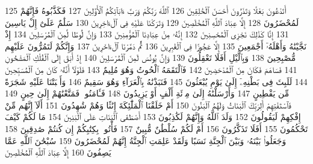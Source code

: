 {\tiny\colorbox{cl_aya}{125}} أَتَدْعُونَ بَعْلًا وَتَذَرُونَ أَحْسَنَ ٱلْخَٰلِقِينَ
{\tiny\colorbox{cl_aya}{126}} ٱللَّهَ رَبَّكُمْ وَرَبَّ ءَابَآئِكُمُ ٱلْأَوَّلِينَ
{\tiny\colorbox{cl_aya}{127}} فَكَذَّبُوهُ فَإِنَّهُمْ لَمُحْضَرُونَ
{\tiny\colorbox{cl_aya}{128}} إِلَّا عِبَادَ ٱللَّهِ ٱلْمُخْلَصِينَ
{\tiny\colorbox{cl_aya}{129}} وَتَرَكْنَا عَلَيْهِ فِى ٱلْءَاخِرِينَ
{\tiny\colorbox{cl_aya}{130}} سَلَٰمٌ عَلَىٰٓ إِلْ يَاسِينَ
{\tiny\colorbox{cl_aya}{131}} إِنَّا كَذَٰلِكَ نَجْزِى ٱلْمُحْسِنِينَ
{\tiny\colorbox{cl_aya}{132}} إِنَّهُۥ مِنْ عِبَادِنَا ٱلْمُؤْمِنِينَ
{\tiny\colorbox{cl_aya}{133}} وَإِنَّ لُوطًا لَّمِنَ ٱلْمُرْسَلِينَ
{\tiny\colorbox{cl_aya}{134}} إِذْ نَجَّيْنَٰهُ وَأَهْلَهُۥٓ أَجْمَعِينَ
{\tiny\colorbox{cl_aya}{135}} إِلَّا عَجُوزًا فِى ٱلْغَٰبِرِينَ
{\tiny\colorbox{cl_aya}{136}} ثُمَّ دَمَّرْنَا ٱلْءَاخَرِينَ
{\tiny\colorbox{cl_aya}{137}} وَإِنَّكُمْ لَتَمُرُّونَ عَلَيْهِم مُّصْبِحِينَ
{\tiny\colorbox{cl_aya}{138}} وَبِٱلَّيْلِ أَفَلَا تَعْقِلُونَ
{\tiny\colorbox{cl_aya}{139}} وَإِنَّ يُونُسَ لَمِنَ ٱلْمُرْسَلِينَ
{\tiny\colorbox{cl_aya}{140}} إِذْ أَبَقَ إِلَى ٱلْفُلْكِ ٱلْمَشْحُونِ
{\tiny\colorbox{cl_aya}{141}} فَسَاهَمَ فَكَانَ مِنَ ٱلْمُدْحَضِينَ
{\tiny\colorbox{cl_aya}{142}} فَٱلْتَقَمَهُ ٱلْحُوتُ وَهُوَ مُلِيمٌ
{\tiny\colorbox{cl_aya}{143}} فَلَوْلَآ أَنَّهُۥ كَانَ مِنَ ٱلْمُسَبِّحِينَ
{\tiny\colorbox{cl_aya}{144}} لَلَبِثَ فِى بَطْنِهِۦٓ إِلَىٰ يَوْمِ يُبْعَثُونَ
{\tiny\colorbox{cl_aya}{145}} فَنَبَذْنَٰهُ بِٱلْعَرَآءِ وَهُوَ سَقِيمٌ
{\tiny\colorbox{cl_aya}{146}} وَأَنۢبَتْنَا عَلَيْهِ شَجَرَةً مِّن يَقْطِينٍ
{\tiny\colorbox{cl_aya}{147}} وَأَرْسَلْنَٰهُ إِلَىٰ مِا۟ئَةِ أَلْفٍ أَوْ يَزِيدُونَ
{\tiny\colorbox{cl_aya}{148}} فَـَٔامَنُوا۟ فَمَتَّعْنَٰهُمْ إِلَىٰ حِينٍ
{\tiny\colorbox{cl_aya}{149}} فَٱسْتَفْتِهِمْ أَلِرَبِّكَ ٱلْبَنَاتُ وَلَهُمُ ٱلْبَنُونَ
{\tiny\colorbox{cl_aya}{150}} أَمْ خَلَقْنَا ٱلْمَلَٰٓئِكَةَ إِنَٰثًا وَهُمْ شَٰهِدُونَ
{\tiny\colorbox{cl_aya}{151}} أَلَآ إِنَّهُم مِّنْ إِفْكِهِمْ لَيَقُولُونَ
{\tiny\colorbox{cl_aya}{152}} وَلَدَ ٱللَّهُ وَإِنَّهُمْ لَكَٰذِبُونَ
{\tiny\colorbox{cl_aya}{153}} أَصْطَفَى ٱلْبَنَاتِ عَلَى ٱلْبَنِينَ
{\tiny\colorbox{cl_aya}{154}} مَا لَكُمْ كَيْفَ تَحْكُمُونَ
{\tiny\colorbox{cl_aya}{155}} أَفَلَا تَذَكَّرُونَ
{\tiny\colorbox{cl_aya}{156}} أَمْ لَكُمْ سُلْطَٰنٌ مُّبِينٌ
{\tiny\colorbox{cl_aya}{157}} فَأْتُوا۟ بِكِتَٰبِكُمْ إِن كُنتُمْ صَٰدِقِينَ
{\tiny\colorbox{cl_aya}{158}} وَجَعَلُوا۟ بَيْنَهُۥ وَبَيْنَ ٱلْجِنَّةِ نَسَبًا وَلَقَدْ عَلِمَتِ ٱلْجِنَّةُ إِنَّهُمْ لَمُحْضَرُونَ
{\tiny\colorbox{cl_aya}{159}} سُبْحَٰنَ ٱللَّهِ عَمَّا يَصِفُونَ
{\tiny\colorbox{cl_aya}{160}} إِلَّا عِبَادَ ٱللَّهِ ٱلْمُخْلَصِينَ
